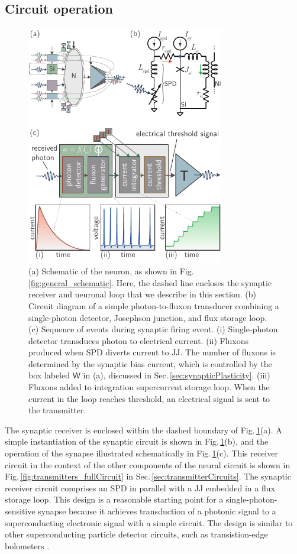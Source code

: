 \documentclass[twocolumn]{article}
\begin{document}
\subsection{\label{sec:circuitOperation}Circuit operation}
\begin{figure}[t!]
	\centerline{\includegraphics[width=8.6cm]{_receivers_schematic_small.pdf}}
	\caption{\label{fig:receivers_schematic}(a) Schematic of the neuron, as shown in Fig.\,\ref{fig:general_schematic}. Here, the dashed line encloses the synaptic receiver and neuronal loop that we describe in this section. (b) Circuit diagram of a simple photon-to-fluxon transducer combining a single-photon detector, Josephson junction, and flux storage loop. (c) Sequence of events during synaptic firing event. (i) Single-photon detector transduces photon to electrical current. (ii) Fluxons produced when SPD diverts current to JJ. The number of fluxons is determined by the synaptic bias current, which is controlled by the box labeled $\mathsf{W}$ in (a), discussed in Sec.\,\ref{sec:synapticPlasticity}. (iii) Fluxons added to integration supercurrent storage loop. When the current in the loop reaches threshold, an electrical signal is sent to the transmitter.}
\end{figure}
The synaptic receiver is enclosed within the dashed boundary of Fig.\,\ref{fig:receivers_schematic}(a). A simple instantiation of the synaptic circuit is shown in Fig.\,\ref{fig:receivers_schematic}(b), and the operation of the synapse illustrated schematically in Fig.\,\ref{fig:receivers_schematic}(c). This receiver circuit in the context of the other components of the neural circuit is shown in Fig.\,\ref{fig:transmitters_fullCircuit} in Sec.\,\ref{sec:transmitterCircuits}. The synaptic receiver circuit comprises an SPD in parallel with a JJ embedded in a flux storage loop. This design is a reasonable starting point for a single-photon-sensitive synapse because it achieves transduction of a photonic signal to a superconducting electronic signal with a simple circuit. The design is similar to other superconducting particle detector circuits, such as transistion-edge bolometers \cite{vatu1998}. 
\end{document}
